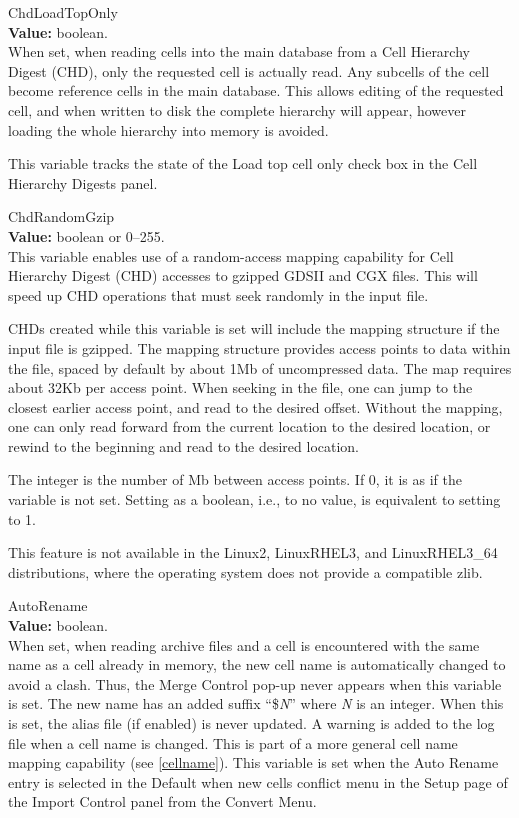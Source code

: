 \begin{description}
\item{\et ChdLoadTopOnly}\\
{\bf Value:} boolean.\\
When set, when reading cells into the main database from a Cell
Hierarchy Digest (CHD), only the requested cell is actually read.  Any
subcells of the cell become reference cells in the main database. 
This allows editing of the requested cell, and when written to disk
the complete hierarchy will appear, however loading the whole
hierarchy into memory is avoided.

This variable tracks the state of the {\cb Load top cell only} check
box in the {\cb Cell Hierarchy Digests} panel.

\item{\et ChdRandomGzip}\\
{\bf Value:} boolean or 0--255.\\
This variable enables use of a random-access mapping capability for
Cell Hierarchy Digest (CHD) accesses to gzipped GDSII and CGX files. 
This will speed up CHD operations that must seek randomly in the input
file.

CHDs created while this variable is set will include the mapping
structure if the input file is gzipped.  The mapping structure
provides access points to data within the file, spaced by default by
about 1Mb of uncompressed data.  The map requires about 32Kb per
access point.  When seeking in the file, one can jump to the closest
earlier access point, and read to the desired offset.  Without the
mapping, one can only read forward from the current location to the
desired location, or rewind to the beginning and read to the desired
location.

The integer is the number of Mb between access points.  If 0, it is as
if the variable is not set.  Setting as a boolean, i.e., to no value,
is equivalent to setting to 1.

This feature is not available in the Linux2, LinuxRHEL3, and
LinuxRHEL3\_64 distributions, where the operating system does not
provide a compatible {\vt zlib}.

\item{\et AutoRename}\\
{\bf Value:} boolean.\\
When set, when reading archive files and a cell is encountered with
the same name as a cell already in memory, the new cell name is
automatically changed to avoid a clash.  Thus, the {\cb Merge Control}
pop-up never appears when this variable is set.  The new name has an
added suffix ``{\vt \$}{\it N}'' where {\it N} is an integer.  When
this is set, the alias file (if enabled) is never updated.  A warning
is added to the log file when a cell name is changed.  This is part of
a more general cell name mapping capability (see \ref{cellname}). 
This variable is set when the {\cb Auto Rename} entry is selected in
the {\cb Default when new cells conflict} menu in the {\cb Setup} page
of the {\cb Import Control} panel from the {\cb Convert Menu}.


\end{description}
